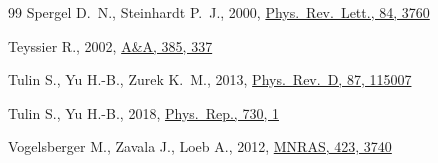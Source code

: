 \documentclass[fleqn,usenatbib]{mnras}
\begin{document}
\begin{thebibliography}{99}
Spergel D.~N., Steinhardt P.~J., 2000, \href{https://doi.org/10.1103/PhysRevLett.84.3760}{Phys.\ Rev.\ Lett., 84, 3760}

Teyssier R., 2002, \href{https://doi.org/10.1051/0004-6361:20011817}{A\&A, 385, 337}

Tulin S., Yu H.-B., Zurek K.~M., 2013, \href{https://doi.org/10.1103/PhysRevD.87.115007}{Phys.\ Rev.\ D, 87, 115007}

Tulin S., Yu H.-B., 2018, \href{https://doi.org/10.1016/j.physrep.2017.11.004}{Phys.\ Rep., 730, 1}

Vogelsberger M., Zavala J., Loeb A., 2012, \href{https://doi.org/10.1111/j.1365-2966.2012.21182.x}{MNRAS, 423, 3740}

\end{thebibliography}


\label{lastpage}
\end{document}

